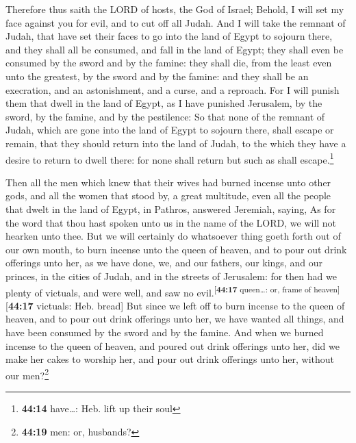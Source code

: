  Therefore thus saith the LORD of hosts, the God of
Israel; Behold, I will set my face against you for evil, and to cut off
all Judah.  And I will take the remnant of Judah, that
have set their faces to go into the land of Egypt to sojourn there, and
they shall all be consumed, and fall in the land of Egypt; they shall
even be consumed by the sword and by the famine: they shall die, from
the least even unto the greatest, by the sword and by the famine: and
they shall be an execration, and an astonishment, and a curse, and a
reproach.  For I will punish them that dwell in the land
of Egypt, as I have punished Jerusalem, by the sword, by the famine, and
by the pestilence:  So that none of the remnant of Judah,
which are gone into the land of Egypt to sojourn there, shall escape or
remain, that they should return into the land of Judah, to the which
they have a desire to return to dwell there: for none shall return but
such as shall escape.\footnote{\textbf{44:14} have\ldots: Heb. lift up
  their soul}

 Then all the men which knew that their wives had burned
incense unto other gods, and all the women that stood by, a great
multitude, even all the people that dwelt in the land of Egypt, in
Pathros, answered Jeremiah, saying,  As for the word that
thou hast spoken unto us in the name of the LORD, we will not hearken
unto thee.  But we will certainly do whatsoever thing
goeth forth out of our own mouth, to burn incense unto the queen of
heaven, and to pour out drink offerings unto her, as we have done, we,
and our fathers, our kings, and our princes, in the cities of Judah, and
in the streets of Jerusalem: for then had we plenty of victuals, and
were well, and saw no evil.\textsuperscript{{[}\textbf{44:17}
queen\ldots: or, frame of heaven{]}}{[}\textbf{44:17} victuals: Heb.
bread{]}  But since we left off to burn incense to the
queen of heaven, and to pour out drink offerings unto her, we have
wanted all things, and have been consumed by the sword and by the
famine.  And when we burned incense to the queen of
heaven, and poured out drink offerings unto her, did we make her cakes
to worship her, and pour out drink offerings unto her, without our
men?\footnote{\textbf{44:19} men: or, husbands?}

